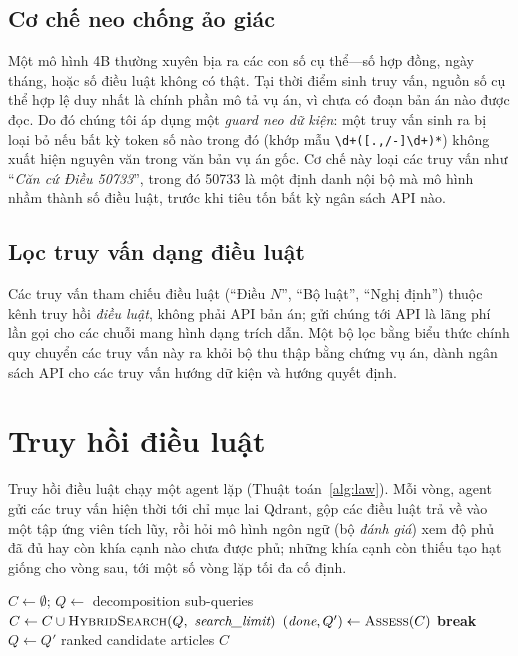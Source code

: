 \documentclass[conference]{IEEEtran}
\begin{document}
\subsection{Cơ chế neo chống ảo giác}
Một mô hình 4B thường xuyên bịa ra các con số cụ thể---số hợp đồng, ngày tháng, hoặc số điều luật không có thật. Tại thời điểm sinh truy vấn, nguồn số cụ thể hợp lệ duy nhất là chính phần mô tả vụ án, vì chưa có đoạn bản án nào được đọc. Do đó chúng tôi áp dụng một \emph{guard neo dữ kiện}: một truy vấn sinh ra bị loại bỏ nếu bất kỳ token số nào trong đó (khớp mẫu \texttt{\textbackslash d+([.,/-]\textbackslash d+)*}) không xuất hiện nguyên văn trong văn bản vụ án gốc. Cơ chế này loại các truy vấn như ``\textit{Căn cứ Điều 50733}'', trong đó \textsf{50733} là một định danh nội bộ mà mô hình nhầm thành số điều luật, trước khi tiêu tốn bất kỳ ngân sách API nào.

\subsection{Lọc truy vấn dạng điều luật}
Các truy vấn tham chiếu điều luật (``Điều $N$'', ``Bộ luật'', ``Nghị định'') thuộc kênh truy hồi \emph{điều luật}, không phải API bản án; gửi chúng tới API là lãng phí lần gọi cho các chuỗi mang hình dạng trích dẫn. Một bộ lọc bằng biểu thức chính quy chuyển các truy vấn này ra khỏi bộ thu thập bằng chứng vụ án, dành ngân sách API cho các truy vấn hướng dữ kiện và hướng quyết định.

\section{Truy hồi điều luật}
Truy hồi điều luật chạy một agent lặp (Thuật toán~\ref{alg:law}). Mỗi vòng, agent gửi các truy vấn hiện thời tới chỉ mục lai Qdrant, gộp các điều luật trả về vào một tập ứng viên tích lũy, rồi hỏi mô hình ngôn ngữ (bộ \emph{đánh giá}) xem độ phủ đã đủ hay còn khía cạnh nào chưa được phủ; những khía cạnh còn thiếu tạo hạt giống cho vòng sau, tới một số vòng lặp tối đa cố định.

\begin{algorithm}[t]
  \caption{Iterative Statute Retrieval}
  \label{alg:law}
  \begin{algorithmic}[1]
    \STATE $C \gets \emptyset$; $Q \gets$ decomposition sub-queries
    \STATE $C \gets C \cup \textsc{HybridSearch}(Q,\ \textit{search\_limit})$
    \STATE $(\textit{done}, Q') \gets \textsc{Assess}(C)$ 
     \STATE \textbf{break} \ENDIF
    \STATE $Q \gets Q'$
    \ENDFOR
    \RETURN ranked candidate articles $C$
  \end{algorithmic}
\end{algorithm}
\end{document}
